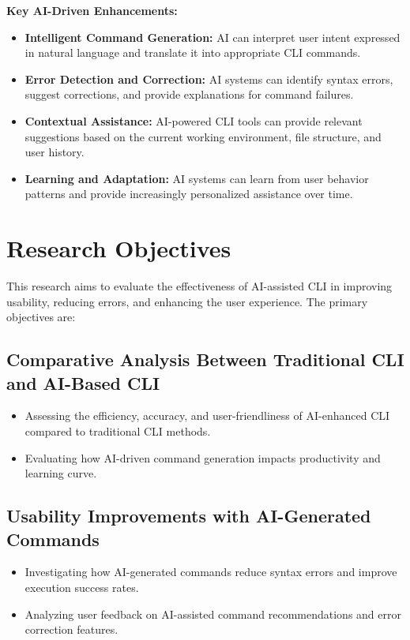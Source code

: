 \textbf{Key AI-Driven Enhancements:}
\begin{itemize}
	\item \textbf{Intelligent Command Generation:} AI can interpret user intent expressed in natural language and translate it into appropriate CLI commands.
	\item \textbf{Error Detection and Correction:} AI systems can identify syntax errors, suggest corrections, and provide explanations for command failures.
	\item \textbf{Contextual Assistance:} AI-powered CLI tools can provide relevant suggestions based on the current working environment, file structure, and user history.
	\item \textbf{Learning and Adaptation:} AI systems can learn from user behavior patterns and provide increasingly personalized assistance over time.
\end{itemize}

\section{Research Objectives}

This research aims to evaluate the effectiveness of AI-assisted CLI in improving usability, reducing errors, and enhancing the user experience. The primary objectives are:

\subsection{Comparative Analysis Between Traditional CLI and AI-Based CLI}
\begin{itemize}
	\item Assessing the efficiency, accuracy, and user-friendliness of AI-enhanced CLI compared to traditional CLI methods.
	\item Evaluating how AI-driven command generation impacts productivity and learning curve.
\end{itemize}

\subsection{Usability Improvements with AI-Generated Commands}
\begin{itemize}
	\item Investigating how AI-generated commands reduce syntax errors and improve execution success rates.
	\item Analyzing user feedback on AI-assisted command recommendations and error correction features.
\end{itemize}

